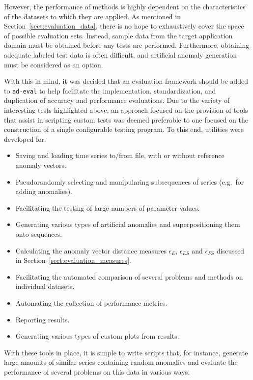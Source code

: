 However, the performance of methods is highly dependent on the characteristics of the datasets to which they are applied. As mentioned in Section~\ref{sect:evaluation_data}, there is no hope to exhaustively cover the space of possible evaluation sets. Instead, sample data from the target application domain must be obtained before any tests are performed. Furthermore, obtaining adequate labeled test data is often difficult, and artificial anomaly generation must be considered as an option.

With this in mind, it was decided that an evaluation framework should be added to \texttt{ad-eval} to help facilitate the implementation, standardization, and duplication of accuracy and performance evaluations. Due to the variety of interesting tests highlighted above, an approach focused on the provision of tools that assist in scripting custom tests was deemed preferable to one focused on the construction of a single configurable testing program. To this end, utilities were developed for:

\begin{itemize}
    \item Saving and loading time series to/from file, with or without reference anomaly vectors.
    \item Pseudorandomly selecting and manipularing subsequences of series (e.g.\ for adding anomalies).
    \item Facilitating the testing of large numbers of parameter values.
    \item Generating various types of artificial anomalies and superpositioning them onto sequences.
    \item Calculating the anomaly vector distance measures $\epsilon_E$, $\epsilon_{ES}$ and $\epsilon_{FS}$ discussed in Section~\ref{sect:evaluation_measures}.
    \item Facilitating the automated comparison of several problems and methods on individual datasets.
    \item Automating the collection of performance metrics.
    \item Reporting results.
    \item Generating various types of custom plots from results.
\end{itemize}

With these tools in place, it is simple to write scripts that, for instance, generate large amounts of similar series containing random anomalies and evaluate the performance of several problems on this data in various ways. 

